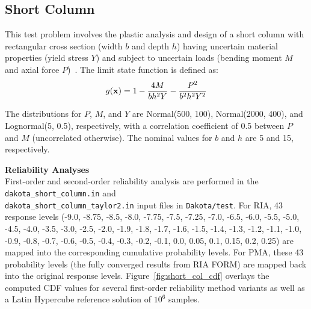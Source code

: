 \subsection{Short Column}\label{additional:short_column}

This test problem involves the plastic analysis and design of a short
column with rectangular cross section (width $b$ and depth $h$) having
uncertain material properties (yield stress $Y$) and subject to
uncertain loads (bending moment $M$ and axial force $P$)~\cite{Kus97}.
The limit state function is defined as:
\begin{equation}
g({\bf x}) = 1 - \frac{4M}{b h^2 Y} - \frac{P^2}{b^2 h^2 Y^2}
\end{equation}

The distributions for $P$, $M$, and $Y$ are Normal(500, 100),
Normal(2000, 400), and Lognormal(5, 0.5), respectively, with a
correlation coefficient of 0.5 between $P$ and $M$ (uncorrelated
otherwise). The nominal values for $b$ and $h$ are 5 and 15,
respectively.

{\bf Reliability Analyses} \\

First-order and second-order reliability analysis are performed in the
\texttt{dakota\_short\_column.in} and \\
\texttt{dakota\_short\_column\_taylor2.in} input files in
{\tt Dakota/test}. For RIA, 43 response levels (-9.0, -8.75,
-8.5, -8.0, -7.75, -7.5, -7.25, -7.0, -6.5, -6.0, -5.5, -5.0, -4.5,
-4.0, -3.5, -3.0, -2.5, -2.0, -1.9, -1.8, -1.7, -1.6, -1.5, -1.4,
-1.3, -1.2, -1.1, -1.0, -0.9, -0.8, -0.7, -0.6, -0.5, -0.4, -0.3,
-0.2, -0.1, 0.0, 0.05, 0.1, 0.15, 0.2, 0.25) are mapped into the
corresponding cumulative probability levels. For PMA, these 43
probability levels (the fully converged results from RIA FORM) are
mapped back into the original response levels.
Figure~\ref{fig:short_col_cdf} overlays the computed CDF values for
several first-order reliability method variants as well as a Latin
Hypercube reference solution of $10^6$ samples.


